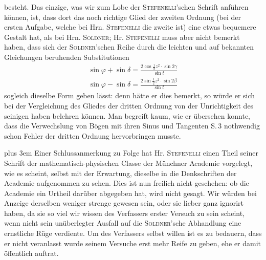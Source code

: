 besteht. Das einzige, was wir zum Lobe der \textsc{Stefenelli}'schen Schrift anführen können, ist,
dass dort das noch richtige Glied der zweiten Ordnung (bei der ersten Aufgabe, welche bei Hrn.
\textsc{Stefenelli} die zweite ist) eine etwas bequemere Gestalt hat, als bei Hrn. \textsc{Soldner};
Hr. \textsc{Stefenelli} muss aber nicht bemerkt haben, dass sich der \textsc{Soldner}'schen Reihe
durch die leichten und auf bekannten Gleichungen beruhenden Substitutionen
\[
\begin{gathered}
\sin\varphi+\sin\delta=\frac{2\cos\frac{1}{2}z^2\cdot\sin2\gamma}{\sin t}\\[5pt]
\sin\varphi-\sin\delta=\frac{2\sin\frac{1}{2}z^2\cdot\sin2\beta}{\sin t}
\end{gathered}
\]
sogleich dieselbe Form geben lässt: denn hätte er dies bemerkt, so würde er sich bei der
Vergleichung des Gliedes der dritten Ordnung von der Unrichtigkeit des seinigen haben belehren
können. Man begreift kaum, wie er übersehen konnte, dass die Verwechslung von Bögen mit ihren
Sinus und Tangenten S.\,3 nothwendig schon Fehler der dritten Ordnung hervorbringen musste.

\begingroup\rightskip=0pt plus 3em
Einer Schlussanmerkung zu Folge hat Hr. \textsc{Stefenelli} einen Theil seiner Schrift der
mathematisch-physischen Classe der Münchner Academie vorgelegt, wie es scheint, selbst mit der
Erwartung, dieselbe in die Denkschriften der Academie aufgenommen zu sehen. Dies ist nun freilich
nicht geschehen: ob die Academie ein Urtheil darüber abgegeben hat, wird nicht gesagt. Wir würden
bei Anzeige derselben weniger strenge gewesen sein, oder sie lieber ganz ignorirt haben, da sie so
viel wir wissen des Verfassers erster Versuch zu sein scheint, wenn nicht sein unüberlegter Ausfall
auf die \textsc{Soldner}'sche Abhandlung eine ernstliche Rüge verdiente. Um des Verfassers selbst
willen ist es zu bedauern, dass er nicht veranlasst wurde seinem Versuche erst mehr Reife zu geben,
ehe er damit öffentlich auftrat.\par\endgroup
